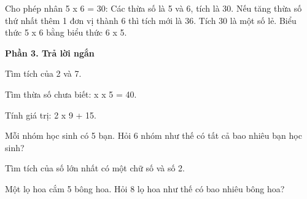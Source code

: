 \begin{ex} %
Cho phép nhân 5 x 6 = 30:
\choiceTF
{\True Các thừa số là 5 và 6, tích là 30.}
{\True Nếu tăng thừa số thứ nhất thêm 1 đơn vị thành 6 thì tích mới là 36.}
{Tích 30 là một số lẻ.}
{\True Biểu thức 5 x 6 bằng biểu thức 6 x 5.}
\end{ex}

\textbf{Phần 3. Trả lời ngắn}

\begin{ex} %
Tìm tích của 2 và 7.
\end{ex}

\begin{ex} %
Tìm thừa số chưa biết: x x 5 = 40.
\end{ex}

\begin{ex} %
Tính giá trị: 2 x 9 + 15.
\end{ex}

\begin{ex} %
Mỗi nhóm học sinh có 5 bạn. Hỏi 6 nhóm như thế có tất cả bao nhiêu bạn học sinh?
\end{ex}

\begin{ex} %
Tìm tích của số lớn nhất có một chữ số và số 2.
\end{ex}

\begin{ex} %
Một lọ hoa cắm 5 bông hoa. Hỏi 8 lọ hoa như thế có bao nhiêu bông hoa?
\end{ex}
